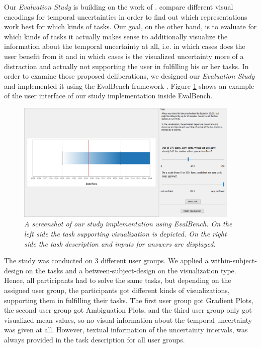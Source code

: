 Our \textit{Evaluation Study} is building on the work of \citet{gschwandtner2016visual}. \citet{gschwandtner2016visual} compare different visual encodings for temporal uncertainties in order to find out which representations work best for which kinds of tasks. Our goal, on the other hand, is to evaluate for which kinds of tasks it actually makes sense to additionally visualize the information about the temporal uncertainty at all, i.e. in which cases does the user benefit from it and in which cases is the visualized uncertainty more of a distraction and actually not supporting the user in fulfilling his or her tasks. In order to examine those proposed deliberations, we designed our \textit{Evaluation Study} and implemented it using the EvalBench framework \cite{aigner2013evalbench}. Figure \ref{fig:EvalBench_GUI} shows an example of the user interface of our study implementation inside EvalBench. \par \medskip

\begin{figure}[H]
	\centering
	\includegraphics[width=0.95\textwidth]{figures/EvalBench_GUI.png}
	\caption{\textit{A screenshot of our study implementation using EvalBench. On the left side the task supporting visualization is depicted. On the right side the task description and inputs for answers are displayed.}}
	\label{fig:EvalBench_GUI}
\end{figure}

The study was conducted on 3 different user groups. We applied a within-subject-design on the tasks and a between-subject-design on the visualization type. Hence, all participants had to solve the same tasks, but depending on the assigned user group, the participants got different kinds of visualizations, supporting them in fulfilling their tasks. The first user group got Gradient Plots, the second user group got Ambiguation Plots, and the third user group only got visualized mean values, so no visual information about the temporal uncertainty was given at all. However, textual information of the uncertainty intervals, was always provided in the task description for all user groups. \par \medskip


